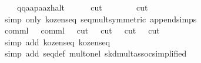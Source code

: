 \begin{isabellebody}
\ \ \ \ {}q{}{}{}{}q{}{}{}{}a{}{}{}{}a{}{}p{}{}{}a{}{}a{}{}z{}{}halt{}{}\isanewline
\ \ \ \ \isamarkupfalse%
\ {}cut\ {}\ {}{}\isanewline
\ \ \ \ \isamarkupfalse%
\ {}cut\ {}\ {}{}\isanewline
\ \ \ \ \isamarkupfalse%
\ {}simp\ only{}\ kozen{}{}seq\ seq{}mult{}symmetric{}\ append{}simps{}\isanewline
\ \ \ \ \isamarkupfalse%
\ {}comml{}\ {}\ {}{}\ comml{}\ {}\ {}{}\ cut\ {}\ {}{}\ cut\ {}\ {}{}\ cut\ {}\ {}{}\ cut\ {}\ {}{}\isanewline
\ \ \ \ \isamarkupfalse%
\ {}simp\ add{}\ kozen{}{}seq{}\ kozen{}{}seq{}{}\isanewline
\ \ \ \ \isamarkupfalse%
\ {}simp\ add{}\ seq{}def\ mult{}onel\ skd{}mult{}assoc{}simplified{}{}\isanewline

\end{isabellebody}
